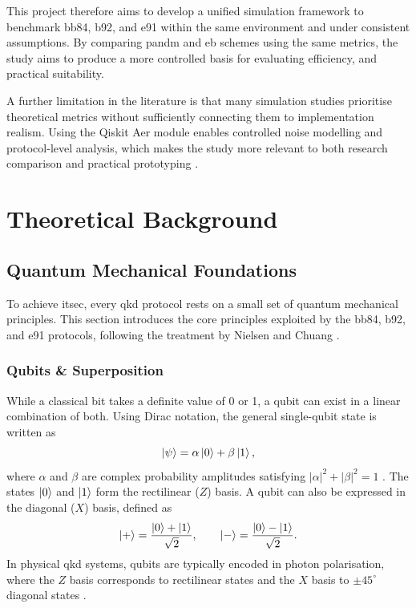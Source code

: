 \documentclass[11pt, a4paper]{report}
\begin{document}
This project therefore aims to develop a unified simulation framework to benchmark \gls{bb84}, \gls{b92}, and \gls{e91} within the same environment and under consistent assumptions. By comparing \gls{pandm} and \gls{eb} schemes using the same metrics, the study aims to produce a more controlled basis for evaluating efficiency, and practical suitability.

A further limitation in the literature is that many simulation studies prioritise theoretical metrics without sufficiently connecting them to implementation realism. Using the Qiskit Aer module enables controlled noise modelling and protocol-level analysis, which makes the study more relevant to both research comparison and practical prototyping \cite{QiskitAer}.



\chapter{Theoretical Background}

\section{Quantum Mechanical Foundations}

To achieve \gls{itsec}, every \gls{qkd} protocol rests on a small set of quantum mechanical principles. This section introduces the core principles exploited by the \gls{bb84}, \gls{b92}, and \gls{e91} protocols, following the treatment by Nielsen and Chuang \cite{QKDbible}.

\subsection{Qubits \& Superposition}
While a classical bit takes a definite value of 0 or 1, a \gls{qubit} can exist in a linear combination of both. Using Dirac notation, the general single-\gls{qubit} state is written as
%
\begin{equation}
\label{eq:qubit}
\ket{\psi} = \alpha\ket{0} + \beta\ket{1},
\end{equation}
%
where $\alpha$ and $\beta$ are complex probability amplitudes satisfying $|\alpha|^{2}+|\beta|^{2}=1$ \cite{QKDbible}. The states $\ket{0}$ and $\ket{1}$ form the rectilinear ($Z$) basis. A \gls{qubit} can also be expressed in the diagonal ($X$) basis, defined as
%
\begin{equation}
\label{eq:diag-basis}
\ket{+} = \frac{\ket{0}+\ket{1}}{\sqrt{2}}, \qquad
\ket{-} = \frac{\ket{0}-\ket{1}}{\sqrt{2}}.
\end{equation}
%
In physical \gls{qkd} systems, \glspl{qubit} are typically encoded in photon polarisation, where the $Z$ basis corresponds to rectilinear states and the $X$ basis to $\pm 45^{\circ}$ diagonal states \cite{BB84}. 
\end{document}

